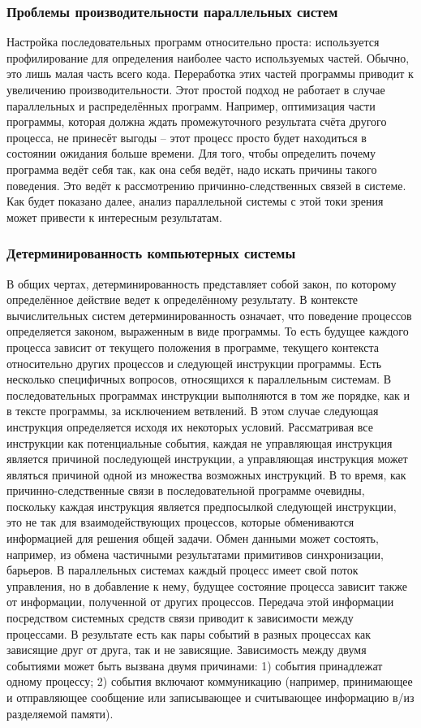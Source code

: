 \subsubsection{Проблемы производительности параллельных систем}
Настройка последовательных программ относительно проста: используется профилирование для определения наиболее часто используемых частей. Обычно, это лишь малая часть всего кода. Переработка этих частей программы приводит к увеличению производительности. Этот простой подход не работает в случае параллельных и распределённых программ. Например, оптимизация части программы, которая должна ждать промежуточного результата счёта другого процесса, не принесёт выгоды – этот процесс просто будет находиться в состоянии ожидания больше времени. Для того, чтобы определить почему программа ведёт себя так, как она себя ведёт, надо искать причины такого поведения. Это ведёт к рассмотрению причинно-следственных связей в системе. Как будет показано далее, анализ параллельной системы с этой токи зрения может привести к интересным результатам.
\subsubsection{Детерминированность компьютерных системы}
В общих чертах, детерминированность представляет собой закон, по которому определённое действие ведет к определённому результату. В контексте вычислительных систем детерминированность означает, что поведение процессов определяется законом, выраженным в виде программы. То есть будущее каждого процесса зависит от текущего положения в программе, текущего контекста относительно других процессов и следующей инструкции программы. Есть несколько специфичных вопросов, относящихся к параллельным системам. В последовательных программах инструкции выполняются в том же порядке, как и в тексте программы, за исключением ветвлений. В этом случае следующая инструкция определяется исходя их некоторых условий. Рассматривая все инструкции как потенциальные события, каждая не управляющая инструкция является причиной последующей инструкции, а управляющая инструкция может являться причиной одной из множества возможных инструкций. В то время, как причинно-следственные связи в последовательной программе очевидны, поскольку каждая инструкция является предпосылкой следующей инструкции, это не так для взаимодействующих процессов, которые обмениваются информацией для решения общей задачи. Обмен данными может состоять, например, из обмена частичными результатами примитивов синхронизации, барьеров. В параллельных системах каждый процесс имеет свой поток управления, но в добавление к нему, будущее состояние процесса зависит также от информации, полученной от других процессов. Передача этой информации посредством системных средств связи приводит к зависимости между процессами. В результате есть как пары событий в разных процессах как зависящие друг от друга, так и не зависящие.
Зависимость между двумя событиями может быть вызвана двумя причинами: 1) события принадлежат одному процессу; 2) события включают коммуникацию (например, принимающее и отправляющее сообщение или записывающее и считывающее информацию в/из разделяемой памяти).
